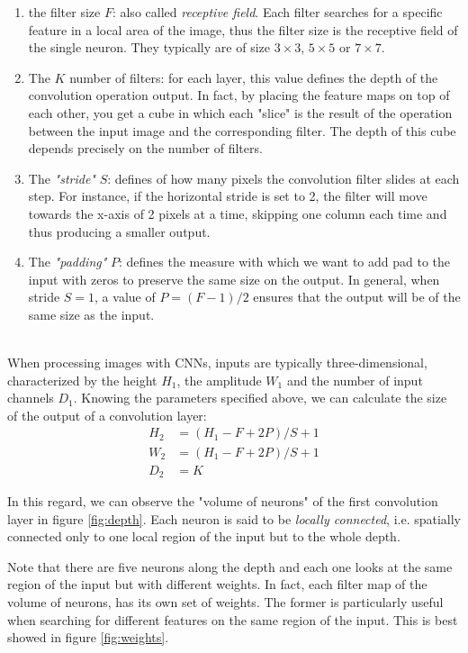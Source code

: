 \begin{enumerate} 
     \item the filter size $F$: also called \emph{receptive field}. Each filter searches for a specific feature in a local area of the image, thus the filter size is the receptive field of the single neuron. They typically are of size $3 \times3$, $5 \times 5$ or $7\times7$.
     
     \item The $K$ number of filters: for each layer, this value defines the depth of the convolution operation output. In fact, by placing the feature maps on top of each other, you get a cube in which each "slice" is the result of the operation between the input image and the corresponding filter. The depth of this cube depends precisely on the number of filters.
     
     \item The \emph{"stride"} $S$: defines of how many pixels the convolution filter slides at each step. For instance, if the horizontal stride is set to 2, the filter will move towards the x-axis of 2 pixels at a time, skipping one column each time and thus producing a smaller output.
     
     \item The \emph{"padding"} $P$: defines the measure with which we want to add pad to the input with zeros to preserve the same size on the output. In general, when stride $S=1$, a value of $P=(F-1)/2$ ensures that the output will be of the same size as the input.
\end{enumerate}

\\

When processing images with CNNs, inputs are typically three-dimensional, characterized by the height $H_1$, the amplitude $W_1$ and the number of input channels $D_1$. Knowing the parameters specified above, we can calculate the size of the output of a convolution layer: 
\begin{align*}
H_2 &=(H_1-F+2P)/S+1\\
W_2 &=(H_1-F+2P)/S+1\\
D_2 &= K
\end{align*}

In this regard, we can observe the "volume of neurons" of the first convolution layer in figure \ref{fig:depth}. Each neuron is said to be \emph{locally connected}, i.e. spatially connected only to one local region of the input but to the whole depth. 


Note that there are five neurons along the depth and each one looks at the same region of the input but with different weights. In fact, each filter map of the volume of neurons, has its own set of weights. The former is particularly useful when searching for different features on the same region of the input. This is best showed in figure \ref{fig:weights}. 
\newline 

